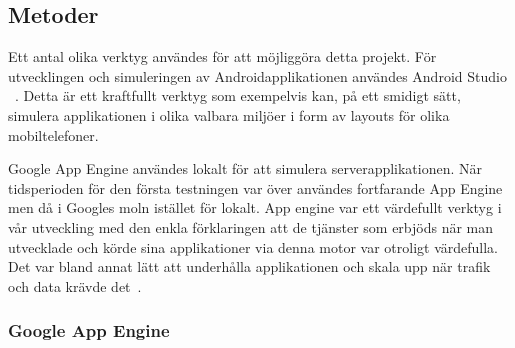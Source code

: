 \documentclass[a4paper, 11pt]{article}
\begin{document}
\subsection{Metoder}
Ett antal olika verktyg användes för att möjliggöra detta projekt. För utvecklingen och simuleringen av Androidapplikationen användes Android Studio ~\cite{androidstudio}. Detta är ett kraftfullt verktyg som exempelvis kan, på ett smidigt sätt, simulera applikationen i olika valbara miljöer i form av layouts för olika mobiltelefoner.


Google App Engine användes lokalt för att simulera serverapplikationen. När tidsperioden för den första testningen var över användes fortfarande App Engine men då i Googles moln istället för lokalt. App engine var ett värdefullt verktyg i vår utveckling med den enkla förklaringen att de tjänster som erbjöds när man utvecklade och körde sina applikationer via denna motor var otroligt värdefulla. Det var bland annat lätt att underhålla applikationen och skala upp när trafik och data krävde det~\cite{googleappengine}. 

%

\subsubsection{Google App Engine} \label{Google App Engine}
\end{document}
